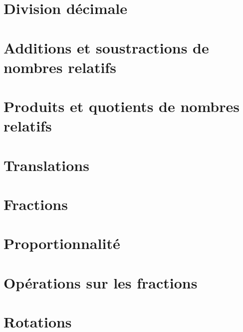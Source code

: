 \documentclass{main}
\begin{document}
        \chapter[division_decimale]{Division décimale}
            \sequencage
            \cours


        \chapter[additions_soustractions_relatifs]{
            Additions et soustractions de nombres relatifs}

        \chapter[produits_quotients_relatifs]{
            Produits et quotients de nombres relatifs}

        \chapter[translations]{Translations}

        \chapter[fractions]{Fractions}

        \chapter[proportionnalite]{Proportionnalité}

        \chapter[operations_fractions]{Opérations sur les fractions}

        \chapter[rotations]{Rotations}
        \devoirs
\end{document}
